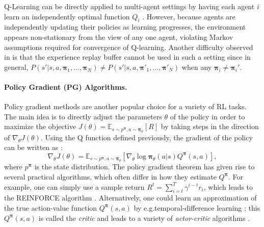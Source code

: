 \documentclass{article}
\newcommand{\pol}[0]{\pmb{\pi}}
\begin{document}
Q-Learning can be directly applied to multi-agent settings by having each agent $i$ learn an independently optimal function $Q_i$ \cite{tan93multi}. However, because agents are independently updating their policies as learning progresses, the environment appears non-stationary from the view of any one agent, violating Markov assumptions required for convergence of Q-learning. Another difficulty observed in \cite{foerster_nonstat} is that the experience replay buffer cannot be used in such a setting since in general, $P(s'|s,a,\pol_1,...,\pol_N) \neq P(s'|s,a,\pol'_1,...,\pol'_N)$ when any $\pol_i \neq \pol_i'$.


\paragraph{Policy Gradient (PG) Algorithms.} Policy gradient methods are another popular choice for a variety of RL tasks.
The main idea is to directly adjust the parameters $\theta$ of the policy in order to maximize the objective $J(\theta) = \mathbb{E}_{s \sim p^{\pol}, a \sim {\pol}_\theta}[R]$ by taking steps in the direction of $\nabla_\theta J(\theta)$. Using the Q function defined previously, the gradient of the policy can be written as \cite{sutton2000policy}:
\begin{equation}
\nabla_\theta J(\theta) = \mathbb{E}_{s \sim p^{\pol}, a \sim {\pol}_\theta} [\nabla_\theta \log \pol_\theta(a|s) Q^{\pol} (s,a)],
\end{equation}
where $p^{\pol}$ is the state distribution. The policy gradient theorem has given rise to several practical algorithms, which often differ in how they estimate $Q^{\pol}$. For example, one can simply use a sample return $R^t = \sum_{i=t}^T \gamma^{i-t}r_i$, which leads to the REINFORCE algorithm \cite{williams1992simple}. 
Alternatively, one could learn an approximation of the true action-value function $Q^{\pol}(s,a)$ by e.g.\@ temporal-difference learning \cite{sutton1998reinforcement}; 
this $Q^{\pol}(s,a)$ is called the \textit{critic} and leads to a variety of \textit{actor-critic} algorithms \cite{sutton1998reinforcement}.
\end{document}
